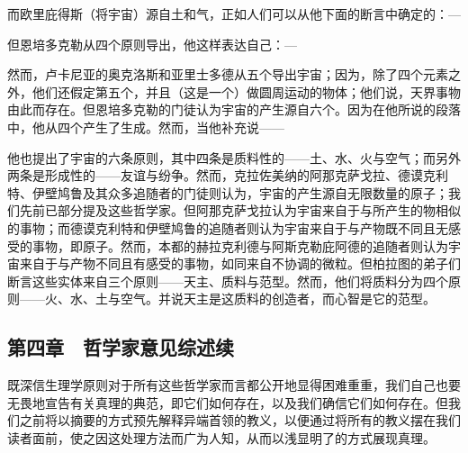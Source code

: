 而欧里庇得斯（将宇宙）源自土和气，正如人们可以从他下面的断言中确定的：—\par

\par

但恩培多克勒从四个原则导出，他这样表达自己：—\par

\par

然而，卢卡尼亚的奥克洛斯和亚里士多德从五个导出宇宙；因为，除了四个元素之外，他们还假定第五个，并且（这是一个）做圆周运动的物体；他们说，天界事物由此而存在。但恩培多克勒的门徒认为宇宙的产生源自六个。因为在他所说的段落中，他从四个产生了生成。然而，当他补充说——\par

\par

他也提出了宇宙的六条原则，其中四条是质料性的——土、水、火与空气；而另外两条是形成性的——友谊与纷争。然而，克拉佐美纳的阿那克萨戈拉、德谟克利特、伊壁鸠鲁及其众多追随者的门徒则认为，宇宙的产生源自无限数量的原子；我们先前已部分提及这些哲学家。但阿那克萨戈拉认为宇宙来自于与所产生的物相似的事物；而德谟克利特和伊壁鸠鲁的追随者则认为宇宙来自于与产物既不同且无感受的事物，即原子。然而，本都的赫拉克利德与阿斯克勒庇阿德的追随者则认为宇宙来自于与产物不同且有感受的事物，如同来自不协调的微粒。但柏拉图的弟子们断言这些实体来自三个原则——天主、质料与范型。然而，他们将质料分为四个原则——火、水、土与空气。并说天主是这质料的创造者，而心智是它的范型。\par


\subsection{第四章　哲学家意见综述续}

既深信生理学原则对于所有这些哲学家而言都公开地显得困难重重，我们自己也要无畏地宣告有关真理的典范，即它们如何存在，以及我们确信它们如何存在。但我们之前将以摘要的方式预先解释异端首领的教义，以便通过将所有的教义摆在我们读者面前，使之因这处理方法而广为人知，从而以浅显明了的方式展现真理。\par

